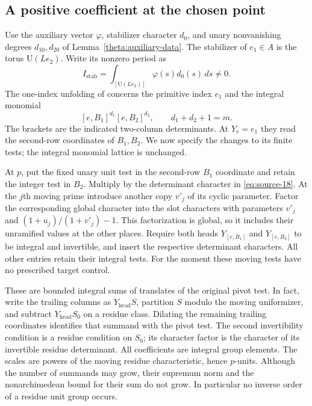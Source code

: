 \subsection{A positive coefficient at the chosen point}

Use the auxiliary vector $\varphi$, stabilizer character $d_0$, and
unary nonvanishing degrees $d_{10},d_{20}$ of
Lemma~\ref{theta:auxiliary-data}.  The stabilizer of $e_1\in A$ is
the torus $\mathrm U(Le_2)$.  Write its nonzero period as
\[
 I_{\mathrm{stab}}
 =\int_{[\mathrm U(Le_2)]}\varphi(s)d_0(s)\,ds\ne0.
\]
The one-index unfolding of \cite[Lemma~6.1]{C} concerns the primitive
index $e_1$ and the integral monomial
\[
                  [e,B_1]^{d_1}[e,B_2]^{d_2},
                  \qquad d_1+d_2+1=m.
\]
The brackets are the indicated two-column determinants.  At $Y_e=e_1$
they read the second-row coordinates of $B_1,B_2$.  We now specify
the changes to its finite tests; the integral monomial lattice is
unchanged.

At $p$, put the fixed unary unit test in the second-row $B_1$
coordinate and retain the integer test in $B_2$.  Multiply by the
determinant character in \eqref{eq:source-18}.  At the $j$th moving
prime introduce another copy $v'_j$ of its cyclic parameter.  Factor
the corresponding global character into the slot characters with
parameters $v'_j$ and
$(1+u_j)/(1+v'_j)-1$.  This factorization is global, so it includes
their unramified values at the other places.  Require both heads
$Y_{[e,B_1]}$ and $Y_{[e,B_2]}$ to be integral and invertible, and
insert the respective determinant characters.  All other entries
retain their integral tests.  For the moment these moving tests have
no prescribed target control.

These are bounded integral sums of translates of the original pivot
test.  In fact, write the trailing columns as $Y_{\mathrm{head}}S$,
partition $S$ modulo the moving uniformizer, and subtract
$Y_{\mathrm{head}}S_0$ on a residue class.  Dilating the remaining
trailing coordinates identifies that summand with the pivot test.
The second invertibility condition is a residue condition on $S_0$;
its character factor is the character of its invertible residue
determinant.  All coefficients are integral group elements.  The
scales are powers of the moving residue characteristic, hence
$p$-units.  Although the number of summands may grow, their supremum
norm and the nonarchimedean bound for their sum do not grow.  In
particular no inverse order of a residue unit group occurs.

